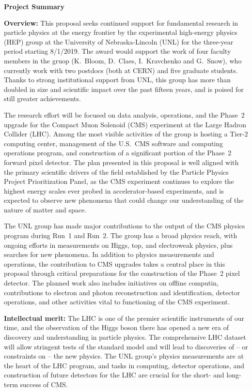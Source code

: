 \documentclass[11pt]{article}
\begin{document}
\begin{center}
{\large \bf Project Summary}\\
\end{center}

{\bf Overview:} This proposal seeks continued support for fundamental research in particle physics at the energy
frontier by the experimental high-energy physics (HEP) group at the University of Nebraska-Lincoln (UNL) for the
three-year period starting 8/1/2019.  The award would support the work of four faculty members in the gruop (K.~Bloom, D.~Claes, I.~Kravchenko and G.~Snow), who currently work with two postdocs (both at CERN) and five graduate students.  Thanks to strong institutional support from UNL, 
this group has more than doubled in size and scientific impact over the 
past fifteen years, and is poised for still greater achievements.

The research effort will be focused on data analysis, operations, and the Phase~2 upgrade for the Compact Muon
Solenoid (CMS) experiment at the Large Hadron Collider (LHC).  Among the most visible activities of the group is hosting a Tier-2 computing center, management of the U.S.~CMS software and computing operations program, and construction of a significant portion of the Phase~2 forward pixel detector.
The plan presented in this proposal is well aligned with the primary scientific drivers of the field established by the Particle Physics Project Prioritization Panel, as the CMS experiment continues to explore the highest
energy scales ever probed in accelerator-based experiments, and
is expected to observe new phenomena that could change our
understanding of the nature of matter and space. 

The UNL group has made major contributions to the output of the CMS physics program during Run~1 and Run~2.  The group has a broad physics reach, with ongoing efforts in measurements on Higgs, top, and electroweak physics, plus searches for new phenomena.  In addition to physics measurements and operations, the contribution to CMS
upgrades takes a central place in this proposal through critical preparations for the construction of the Phase~2 pixel detector.  The planned work also includes initiatives on
offline computin, contributions to electron and photon reconstruction and identification, detector operations, and other activities vital to functioning of the CMS experiment.

{\bf Intellectual merit:} The LHC is one of the premier scientific
instruments of our time, and the observation of the Higgs boson
there has opened a new era of discovery and understanding in
particle physics. The comprehensive LHC dataset 
will allow stringent tests of the standard model and will
lead to discoveries of -- or constraints on -- the new physics.
The UNL group's physics measurements are at the heart of the LHC
program, and tasks in computing, detector operations, and
construction of future detectors for the LHC are crucial for the
short- and long-term success of CMS.
\end{document}

